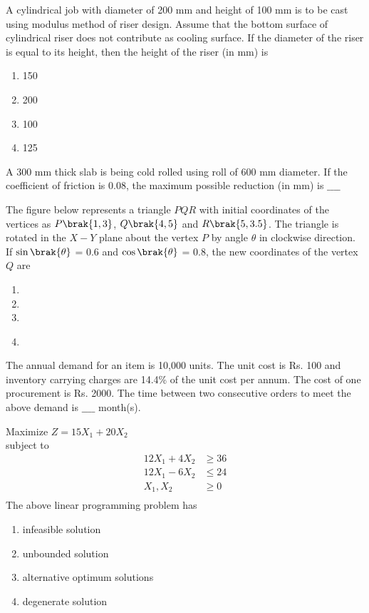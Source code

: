 \item A cylindrical job with diameter of 200 mm and height of 100 mm is to be cast using modulus method of riser design. Assume that the bottom surface of cylindrical riser does not contribute as cooling surface. If the diameter of the riser is equal to its height, then the height of the riser (in mm) is
\begin{enumerate}
    \item 150
    \item 200
    \item 100
    \item 125 \\
\end{enumerate}
\item A 300 mm thick slab is being cold rolled using roll of 600 mm diameter. If the coefficient of friction is 0.08, the maximum possible reduction (in mm) is $\_\_\_\_$ \\
\item The figure below represents a triangle $PQR$ with initial coordinates of the vertices as $P\brak{1,3}$, $Q\brak{4,5}$ and $R\brak{5,3.5}$. The triangle is rotated in the $X-Y$ plane about the vertex $P$ by angle $\theta$ in
clockwise direction. If $\sin\brak{\theta}$ = 0.6 and $\cos\brak{\theta}$ = 0.8, the new coordinates of the vertex $Q$ are
\begin{figure}[!ht]
\centering
\resizebox{0.5\textwidth}{!}{%

}%
\end{figure}
  \begin{enumerate}
   \item {}
   \item {}
   \item {}
   \item {} \\
\end{enumerate}
\item The annual demand for an item is 10,000 units. The unit cost is Rs. 100 and inventory carrying charges are 14.4\% of the unit cost per annum. The cost of one procurement is Rs. 2000. The time between two consecutive orders to meet the above demand is $\_\_\_\_$ month(s). \\
\item Maximize $Z=15X_1 + 20X_2$ \\
subject to \\
\begin{align*}
    12X_1+ 4X_2 & \geq 36 \\
12X_1 - 6X_2 & \leq 24 \\
X_1, X_2 & \geq 0 \\
\end{align*}
The above linear programming problem has
\begin{enumerate}
    \item infeasible solution
    \item unbounded solution
    \item alternative optimum solutions
    \item degenerate solution \\
\end{enumerate}
